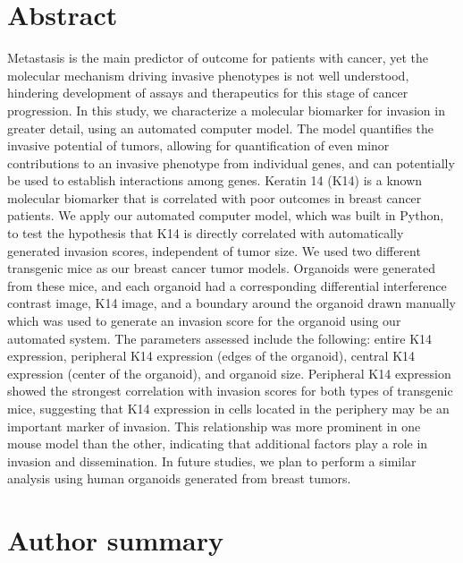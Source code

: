 \documentclass[10pt,letterpaper]{article}
\begin{document}
\section*{Abstract}
Metastasis is the main predictor of outcome for patients with cancer, yet the molecular mechanism driving invasive phenotypes is not well understood, hindering development of assays and therapeutics for this stage of cancer progression. In this study, we characterize a molecular biomarker for invasion in greater detail, using an automated computer model. The model quantifies the invasive potential of tumors, allowing for quantification of even minor contributions to an invasive phenotype from individual genes, and can potentially be used to establish interactions among genes. Keratin 14 (K14) is a known molecular biomarker that is correlated with poor outcomes in breast cancer patients. We apply our automated computer model, which was built in Python, to test the hypothesis that K14 is directly correlated with automatically generated invasion scores, independent of tumor size. We used two different transgenic mice as our breast cancer tumor models. Organoids were generated from these mice, and each organoid had a corresponding differential interference contrast image, K14 image, and a boundary around the organoid drawn manually which was used to generate an invasion score for the organoid using our automated system. The parameters assessed include the following: entire K14 expression, peripheral K14 expression (edges of the organoid), central K14 expression (center of the organoid), and organoid size. Peripheral K14 expression showed the strongest correlation with invasion scores for both types of transgenic mice, suggesting that K14 expression in cells located in the periphery may be an important marker of invasion. This relationship was more prominent in one mouse model than the other, indicating that additional factors play a role in invasion and dissemination. In future studies, we plan to perform a similar analysis using human organoids generated from breast tumors.


\section*{Author summary}

\linenumbers

\end{document}

